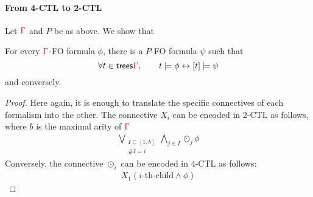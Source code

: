 \paragraph{From 4-CTL to 2-CTL}
Let ${\color{red}{\Gamma}}$ and $P$ be as above. We show that
\begin{lemma}\label{lem:from-4-CTL-to-2CTL}
For every ${\color{red}{\Gamma}}$-FO formula $\phi$, there is a $P$-FO formula $\psi$ such that
$$ \forall t\in \mathsf {trees}{\color{red}{\Gamma}}, \qquad t\models \phi \leftrightarrow [t]\models \psi$$
and conversely. \end{lemma}
\begin{proof}
Here again, it is enough to translate the specific connectives of each formalism into the other. The connective $X_i$ can be encoded in 2-CTL as follows, where $b$ is the maximal arity of ${\color{red}{\Gamma}}$
\begin{align*}
\underset{\begin{array}{c}
{\scriptstyle I\subseteq [1,b]}\\ {\scriptstyle\#I=i}
\end{array}}{\bigvee} \underset{j\in I}{\bigwedge} \odot_j \phi
\end{align*}
Conversely, the connective $\odot_i$ can be encoded in 4-CTL as follows:
\begin{align*}
X_1(i\text{-th-child}\wedge \phi)
\end{align*}
\end{proof}
